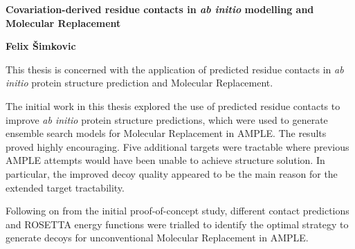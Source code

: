 \begin{center}
    \Large
    \textbf{Covariation-derived residue contacts in \textit{ab initio} modelling and Molecular Replacement}
    
    \vspace{0.5cm}
    \textbf{Felix \v{S}imkovic}
    \vspace{0.5cm}
\end{center}

This thesis is concerned with the application of predicted residue contacts in \textit{ab initio} protein structure prediction and Molecular Replacement.

The initial work in this thesis explored the use of predicted residue contacts to improve \textit{ab initio} protein structure predictions, which were used to generate ensemble search models for Molecular Replacement in AMPLE. The results proved highly encouraging. Five additional targets were tractable where previous AMPLE attempts would have been unable to achieve structure solution. In particular, the improved decoy quality appeared to be the main reason for the extended target tractability.

Following on from the initial proof-of-concept study, different contact predictions and ROSETTA energy functions were trialled to identify the optimal strategy to generate decoys for unconventional Molecular Replacement in AMPLE.



